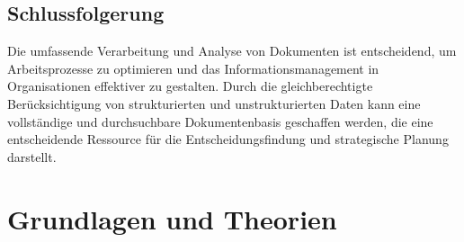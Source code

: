 \documentclass[12pt,a4paper,twoside]{article}
\begin{document}
\subsection{Schlussfolgerung}
Die umfassende Verarbeitung und Analyse von Dokumenten ist entscheidend, um Arbeitsprozesse zu optimieren und das Informationsmanagement in Organisationen effektiver zu gestalten. Durch die gleichberechtigte Berücksichtigung von strukturierten und unstrukturierten Daten kann eine vollständige und durchsuchbare Dokumentenbasis geschaffen werden, die eine entscheidende Ressource für die Entscheidungsfindung und strategische Planung darstellt.
\section{Grundlagen und Theorien}



\end{document}
